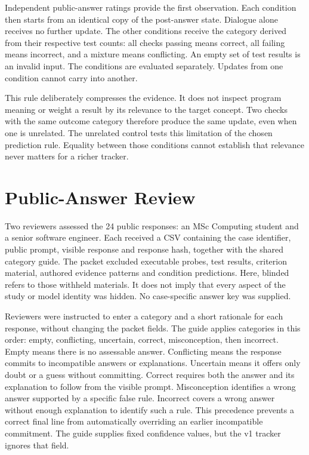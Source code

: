Independent public-answer ratings provide the first observation. Each condition then starts from an identical copy of the
post-answer state. Dialogue alone receives no further update. The other conditions receive the category derived from their
respective test counts: all checks passing means correct, all failing means incorrect, and a mixture means conflicting.
An empty set of test results is an invalid input. The conditions are evaluated separately. Updates from
one condition cannot carry into another.

This rule deliberately compresses the evidence. It does not inspect program meaning or weight a result by its relevance to
the target concept. Two checks with the same outcome category therefore produce the same update, even when one is unrelated.
The unrelated control tests this limitation of the chosen prediction rule. Equality between those conditions cannot establish
that relevance never matters for a richer tracker.

\section{Public-Answer Review}

Two reviewers assessed the 24 public responses: an MSc Computing student and a senior software engineer. Each received a CSV
containing the case identifier, public prompt, visible response and response hash, together with the shared category guide.
The packet excluded executable probes, test results, criterion material, authored evidence patterns and condition predictions.
Here, blinded refers to those withheld materials. It does not imply that every aspect of the study or model identity was hidden.
No case-specific answer key was supplied.

Reviewers were instructed to enter a category and a short rationale for each response, without changing the packet fields.
The guide applies categories in this order: empty, conflicting, uncertain, correct, misconception, then incorrect. Empty means
there is no assessable answer. Conflicting means the response commits to incompatible answers or explanations. Uncertain means
it offers only doubt or a guess without committing. Correct requires both the answer and its explanation to follow from the
visible prompt. Misconception identifies a wrong answer supported by a specific false rule. Incorrect covers a wrong answer
without enough explanation to identify such a rule. This precedence prevents a correct final line from automatically overriding
an earlier incompatible commitment. The guide supplies fixed confidence values, but the v1 tracker ignores that field.


